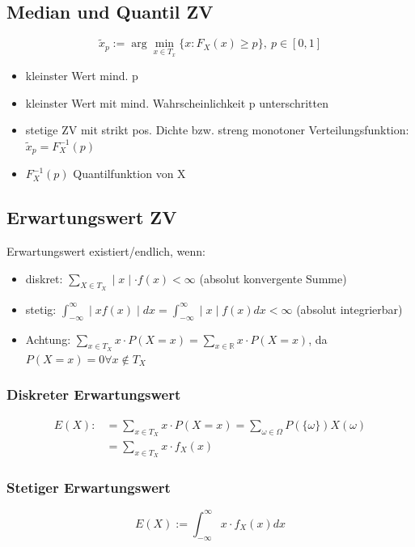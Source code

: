 \documentclass[10pt,a4paper,landscape]{article}
\begin{document}
\begin{multicols}{4}
\subsection{Median und Quantil ZV}
\[
\tilde{x}_p:= \arg \min_{x\in T_x}\{x:F_X(x)\geqslant p\}, ~ p\in [0,1]
\]
\begin{itemize}
\item kleinster Wert mind. p
\item kleinster Wert mit mind. Wahrscheinlichkeit p unterschritten
\item stetige ZV mit strikt pos. Dichte bzw. streng monotoner Verteilungsfunktion: $\tilde{x}_p=F_X^{-1}(p)$
\item $F_X^{-1}(p)$ Quantilfunktion von X
\end{itemize}

\subsection{Erwartungswert ZV}
Erwartungswert existiert/endlich, wenn:
\begin{itemize}
\item diskret: $\sum_{X\in T_X} \mid x \mid \cdot f(x) < \infty$ (absolut konvergente Summe)
\item stetig: $\int_{-\infty}^{\infty} \mid xf(x) \mid dx= \int_{-\infty}^{\infty} \mid x \mid f(x)dx < \infty$ (absolut integrierbar)
\item Achtung: $\sum_{x\in T_X} x\cdot P(X=x)=\sum_{x\in \mathbb{R}} x\cdot P(X=x)$, da $P(X=x)=0 \forall x \notin T_X$
\end{itemize}

\subsubsection*{Diskreter Erwartungswert}
\begin{align*}
E(X) :&=\sum_{x\in T_X} x\cdot P(X=x) = \sum_{\omega \in \Omega} P(\{\omega\})X(\omega) \\
&= \sum_{x\in T_X} x\cdot f_X(x)
\end{align*}

\subsubsection*{Stetiger Erwartungswert}
\[
E(X) := \int_{-\infty}^{\infty} x\cdot f_X(x)dx
\]


\end{multicols}
\end{document}
